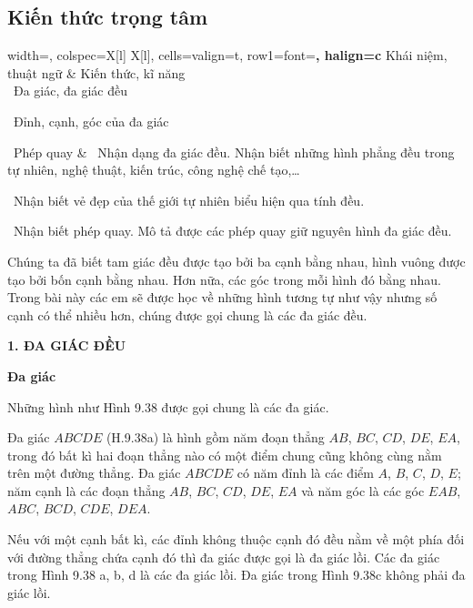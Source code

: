 \begin{lesson}
    \subsection{Kiến thức trọng tâm}

    \begin{center}
        \begin{tblr}{
            width=\linewidth,
            colspec={X[l] X[l]},
            cells={valign=t},
            row{1}={font=\bfseries, halign=c}
        }
            Khái niệm, thuật ngữ & Kiến thức, kĩ năng \\
            \textbullet\ Đa giác, đa giác đều\par
            \textbullet\ Đỉnh, cạnh, góc của đa giác\par
            \textbullet\ Phép quay
            &
            \textbullet\ Nhận dạng đa giác đều. Nhận biết những hình phẳng đều trong tự nhiên, nghệ thuật, kiến trúc, công nghệ chế tạo,\ldots\par
            \textbullet\ Nhận biết vẻ đẹp của thế giới tự nhiên biểu hiện qua tính đều.\par
            \textbullet\ Nhận biết phép quay. Mô tả được các phép quay giữ nguyên hình đa giác đều.
        \end{tblr}
    \end{center}

    Chúng ta đã biết tam giác đều được tạo bởi ba cạnh bằng nhau, hình vuông được tạo bởi bốn cạnh bằng nhau. Hơn nữa, các góc trong mỗi hình đó bằng nhau. Trong bài này các em sẽ được học về những hình tương tự như vậy nhưng số cạnh có thể nhiều hơn, chúng được gọi chung là các đa giác đều.

    \textbf{1. ĐA GIÁC ĐỀU}

    \textbf{Đa giác}

    Những hình như Hình 9.38 được gọi chung là các đa giác.


    Đa giác $ABCDE$ (H.9.38a) là hình gồm năm đoạn thẳng $AB$, $BC$, $CD$, $DE$, $EA$, trong đó bất kì hai đoạn thẳng nào có một điểm chung cũng không cùng nằm trên một đường thẳng. Đa giác $ABCDE$ có năm đỉnh là các điểm $A$, $B$, $C$, $D$, $E$; năm cạnh là các đoạn thẳng $AB$, $BC$, $CD$, $DE$, $EA$ và năm góc là các góc $EAB$, $ABC$, $BCD$, $CDE$, $DEA$.

    Nếu với một cạnh bất kì, các đỉnh không thuộc cạnh đó đều nằm về một phía đối với đường thẳng chứa cạnh đó thì đa giác được gọi là đa giác lồi. Các đa giác trong Hình 9.38 a, b, d là các đa giác lồi. Đa giác trong Hình 9.38c không phải đa giác lồi.


\end{lesson}
